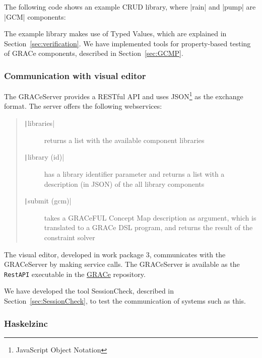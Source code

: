 \documentclass{article}
\newcommand{\haskell}[1]{\texttt|#1|}
\begin{document}
The following code shows an example CRUD library, where |rain| and |pump| are
|GCM| components:
The example library makes use of Typed Values, which are explained in
Section~\ref{sec:verification}.
We have implemented tools for property-based testing of GRACe components,
described in Section~\ref{sec:GCMP}.

\subsubsection*{Communication with visual editor}

The GRACeServer provides a RESTful API and uses JSON\footnote{JavaScript Object
Notation} as the exchange format. The server offers the following webservices:
\begin{quote}
\begin{description}
\item [\haskell{libraries}] returns a list with the available component libraries
\item [\haskell{library (id)}] has a library identifier parameter and returns
  a list with a description (in JSON) of the all library components
\item [\haskell{submit (gcm)}] takes a GRACeFUL Concept Map description as
  argument, which is translated to a GRACe DSL program, and returns the result
  of the constraint solver
\end{description}
\end{quote}
The visual editor, developed in work package 3, communicates with the GRACeServer
by making service calls. The GRACeServer is available as the \texttt{RestAPI}
executable in the \href{https://github.com/GRACeFUL-project/GRACe}{GRACe}
repository.

We have developed the tool SessionCheck, described in
Section~\ref{sec:SessionCheck}, to test the communication of systems such as this.

\subsubsection*{Haskelzinc}
\end{document}

